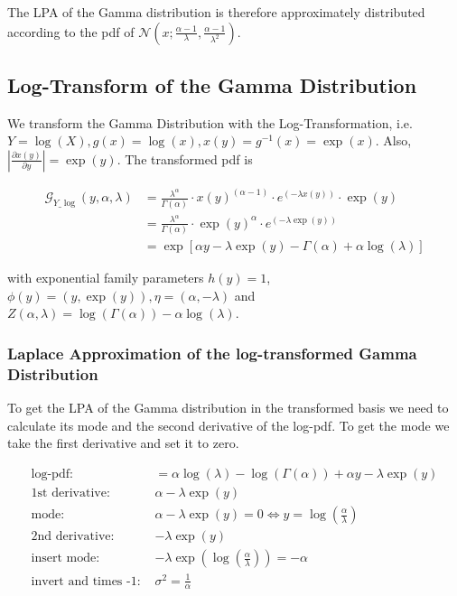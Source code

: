 The LPA of the Gamma distribution is therefore approximately distributed according to the pdf of $\mathcal{N}(x; \frac{\alpha - 1}{\lambda}, \frac{\alpha-1}{\lambda^2})$.


\subsection{Log-Transform of the Gamma Distribution}

We transform the Gamma Distribution with the Log-Transformation, i.e. $Y = \log(X), g(x) = \log(x), x(y) = g^{-1}(x) = \exp(x)$. Also, $\left\vert \frac{\partial x(y)}{\partial y}\right\vert = \exp(y)$. The transformed pdf is

\begin{subequations}
\begin{align}
\mathcal{G}_{Y\_\log }(y, \alpha, \lambda) &= \frac{\lambda^\alpha}{\Gamma(\alpha)} \cdot x(y)^{(\alpha - 1)} \cdot e^{(-\lambda x(y))} \cdot \exp(y) \\ 
&=\frac{\lambda^\alpha}{\Gamma(\alpha)} \cdot \exp(y)^{\alpha} \cdot e^{(-\lambda \exp(y))} \\
&= \exp\left[\alpha y - \lambda\exp(y) - \Gamma(\alpha) + \alpha\log(\lambda) \right]
\end{align}
\end{subequations}

with exponential family parameters $h(y) = 1$, $\phi(y) = (y, \exp(y)), \eta = (\alpha, -\lambda)$ and $Z(\alpha, \lambda) = \log(\Gamma(\alpha)) - \alpha  \log(\lambda)$. 


\subsubsection{Laplace Approximation of the log-transformed Gamma Distribution}

To get the LPA of the Gamma distribution in the transformed basis we need to calculate its mode and the second derivative of the log-pdf. To get the mode we take the first derivative and set it to zero. 

\begin{align*}
\text{log-pdf: } &= \alpha \log(\lambda) - \log(\Gamma(\alpha)) + \alpha y - \lambda \exp(y)\\
\text{1st derivative: }&  \alpha - \lambda \exp(y)\\
\text{mode: }& \alpha - \lambda \exp(y) = 0 \Leftrightarrow y = \log\left(\frac{\alpha}{\lambda}\right)\\
\text{2nd derivative: }&  -\lambda \exp(y)\\
\text{insert mode: }& -\lambda \exp(\log\left(\frac{\alpha}{\lambda}\right)) = -\alpha \\
\text{invert and times -1: }&\sigma^2 = \frac{1}{\alpha}
\end{align*}

